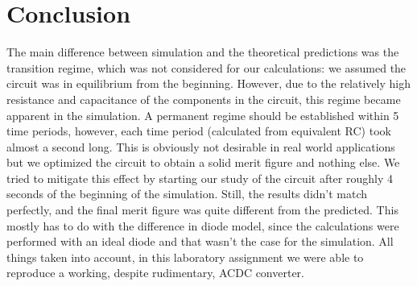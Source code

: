 \newpage
\section{Conclusion}
\label{sec:conclusion}
The main difference between simulation and the theoretical predictions was the transition regime, which was not considered for our calculations: we assumed the circuit was in equilibrium from the beginning. However, due to the relatively high resistance and capacitance of the components in the circuit, this regime became apparent in the simulation. A permanent regime should be established within 5 time periods, however, each time period (calculated from equivalent RC) took almost a second long. This is obviously not desirable in real world applications but we optimized the circuit to obtain a solid merit figure and nothing else.
We tried to mitigate this effect by starting our study of the circuit after roughly 4 seconds of the beginning of the simulation. Still, the results didn't match perfectly, and the final merit figure was quite different from the predicted. This mostly has to do with the difference in diode model, since the calculations were performed with an ideal diode and that wasn't the case for the simulation.
All things taken into account, in this laboratory assignment we were able to reproduce a working, despite rudimentary, ACDC converter. 
